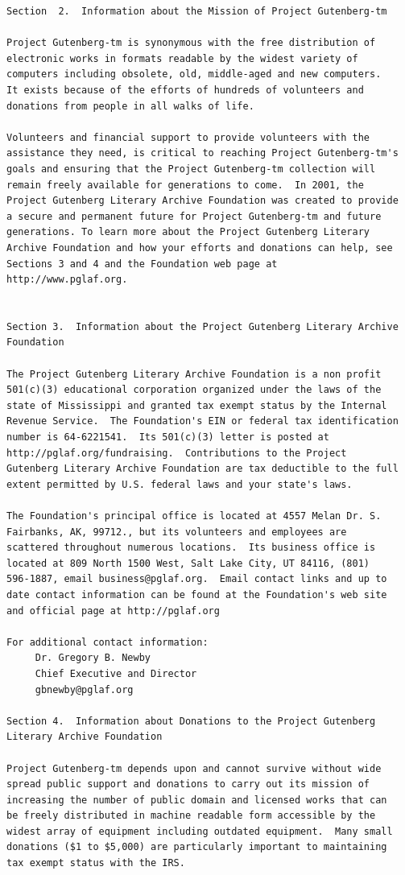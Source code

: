 \documentclass[oneside]{book}
\begin{document}
\begin{verbatim}
Section  2.  Information about the Mission of Project Gutenberg-tm

Project Gutenberg-tm is synonymous with the free distribution of
electronic works in formats readable by the widest variety of
computers including obsolete, old, middle-aged and new computers.
It exists because of the efforts of hundreds of volunteers and
donations from people in all walks of life.

Volunteers and financial support to provide volunteers with the
assistance they need, is critical to reaching Project Gutenberg-tm's
goals and ensuring that the Project Gutenberg-tm collection will
remain freely available for generations to come.  In 2001, the
Project Gutenberg Literary Archive Foundation was created to provide
a secure and permanent future for Project Gutenberg-tm and future
generations. To learn more about the Project Gutenberg Literary
Archive Foundation and how your efforts and donations can help, see
Sections 3 and 4 and the Foundation web page at
http://www.pglaf.org.


Section 3.  Information about the Project Gutenberg Literary Archive
Foundation

The Project Gutenberg Literary Archive Foundation is a non profit
501(c)(3) educational corporation organized under the laws of the
state of Mississippi and granted tax exempt status by the Internal
Revenue Service.  The Foundation's EIN or federal tax identification
number is 64-6221541.  Its 501(c)(3) letter is posted at
http://pglaf.org/fundraising.  Contributions to the Project
Gutenberg Literary Archive Foundation are tax deductible to the full
extent permitted by U.S. federal laws and your state's laws.

The Foundation's principal office is located at 4557 Melan Dr. S.
Fairbanks, AK, 99712., but its volunteers and employees are
scattered throughout numerous locations.  Its business office is
located at 809 North 1500 West, Salt Lake City, UT 84116, (801)
596-1887, email business@pglaf.org.  Email contact links and up to
date contact information can be found at the Foundation's web site
and official page at http://pglaf.org

For additional contact information:
     Dr. Gregory B. Newby
     Chief Executive and Director
     gbnewby@pglaf.org

Section 4.  Information about Donations to the Project Gutenberg
Literary Archive Foundation

Project Gutenberg-tm depends upon and cannot survive without wide
spread public support and donations to carry out its mission of
increasing the number of public domain and licensed works that can
be freely distributed in machine readable form accessible by the
widest array of equipment including outdated equipment.  Many small
donations ($1 to $5,000) are particularly important to maintaining
tax exempt status with the IRS.


\end{verbatim}
\end{document}
